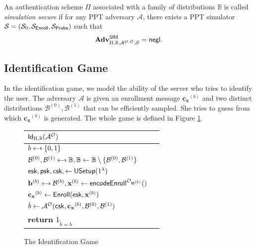 An authentication scheme $\Pi$ associated with a family of distributions $\mathbb{B}$ is called \emph{simulation secure} if for any PPT adversary $\mathcal{A}$, there exists a PPT simulator $\mathcal{S} = (\mathcal{S}_0, \mathcal{S}_{\sf Enroll}, \mathcal{S}_{\sf Probe})$ such that
\[
	\mathbf{Adv}^{\sf SIM}_{\Pi, \mathbb{B}, \mathcal{A}^{\mathcal{O}, \tilde{\mathcal{O}}}, \mathcal{S}} = \mathsf{negl}.
\]


\subsection{Identification Game}
\label{sec:id_game}

In the identification game, we model the ability of the server who tries to identify the user. The adversary $\mathcal{A}$ is given an enrollment message $\mathbf{c_x}^{(b)}$ and two distinct distributions $\mathcal{B}^{(0)}, \mathcal{B}^{(1)}$ that can be efficiently sampled. She tries to guess from which $\mathbf{c_x}^{(b)}$ is generated. The whole game is defined in Figure \ref{fig:id_game}.

\begin{figure}[h]
	\begin{center}
	\begin{tabular}{l c}
		${\sf Id}_{\Pi, \mathbb{B}}(\mathcal{A}^\mathcal{O})$\\

			\hline

			$b \getsdollar \{0, 1\}$ \\

			$\mathcal{B}^{(0)}, \mathcal{B}^{(1)} \getsdollar \mathbb{B}, \mathbb{B} \gets \mathbb{B} \setminus \{ \mathcal{B}^{(0)}, \mathcal{B}^{(1)} \}$ \\

			${\sf esk}, {\sf psk}, {\sf csk}, \gets {\sf USetup}(1^\lambda)$ \\

			$ \mathbf{b}^{(b)} \getsdollar \mathcal{B}^{(b)}, \mathbf{x}^{(b)} \gets {\sf encodeEnroll}^{\mathcal{O}_{\mathbf{B}^{(b)}}}()$ \\

			$\mathbf{c_x}^{(b)} \gets {\sf Enroll}({\sf esk}, \mathbf{x}^{(b)})$ \\

			$\tilde{b} \gets \mathcal{A}^{\mathcal{O}} ( {\sf csk}, \mathbf{c_x}^{(b)}, \mathcal{B}^{(0)}, \mathcal{B}^{(1)} )$ \\

			\textbf{return} $1_{\tilde{b} = b}$
			
	\end{tabular}
	\end{center}
	\caption{The Identification Game}
	\label{fig:id_game}
\end{figure}


